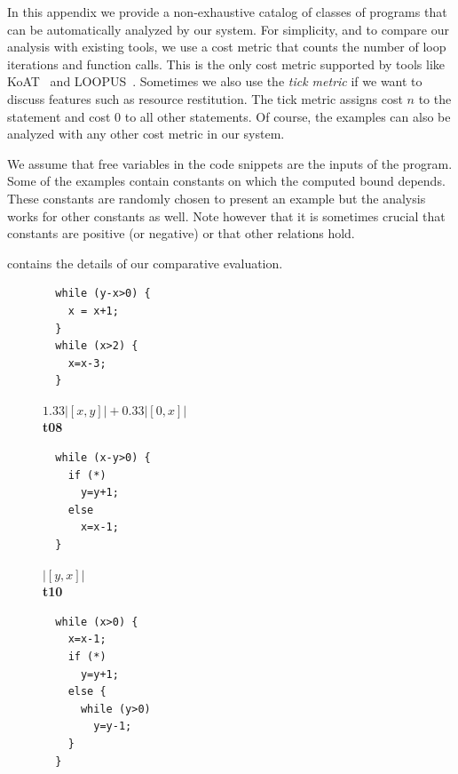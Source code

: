 \documentclass[nocopyrightspace,preprint,pldi]{sigplanconf-pldi15}
\newcommand{\pref}[1]{\prettyref{#1}}
\begin{document}
{In this appendix we provide a non-exhaustive catalog of classes of
programs that can be automatically analyzed by our system.  For
simplicity, and to compare our analysis with existing tools, we use a
cost metric that counts the number of loop iterations and function
calls.  This is the only cost metric supported by tools like
KoAT~\cite{BrockschmidtEFFG14} and LOOPUS~\cite{SinnZV14}.  Sometimes
we also use the \emph{tick metric} if we want to discuss features such as
resource restitution.  The tick metric assigns cost $n$ to the
statement  and cost $0$ to all other statements. Of
course, the examples can also be analyzed with any other cost metric
in our system.

We assume that free variables in the code snippets are the inputs of
the program. Some of the examples contain constants on which the
computed bound depends.  These constants are randomly chosen to
present an example but the analysis works for other constants as well.
Note however that it is sometimes crucial that constants are positive
(or negative) or that other relations hold.

\pref{tab:eval} contains the details of our comparative evaluation.


\begin{figure}
\setlength{\progwidth}{.24\linewidth}
  \centering

  \begin{minipage}[b]{\progwidth}
    \begin{center}
   \begin{lstlisting}
  while (y-x>0) {
    x = x+1;
  }
  while (x>2) {
    x=x-3;
  }
   \end{lstlisting}

$1.33|[x,y]| + 0.33|[0,x]|$
\\[.7\baselineskip]
      {\bf t08}
    \end{center}
  \end{minipage}
%
%
%
  \begin{minipage}[b]{\progwidth}
    \begin{center}
   \begin{lstlisting}
  while (x-y>0) {
    if (*)
      y=y+1;
    else
      x=x-1;
  }
   \end{lstlisting}

$|[y,x]|$
\\[.7\baselineskip]
      {\bf t10}
    \end{center}
  \end{minipage}
%
%
%
  \begin{minipage}[b]{\progwidth}
    \begin{center}
   \begin{lstlisting}
  while (x>0) {
    x=x-1;
    if (*)
      y=y+1;
    else {
      while (y>0)
        y=y-1;
    }
  }
   \end{lstlisting}


\end{center}
\end{minipage}
\end{figure}}
\end{document}
